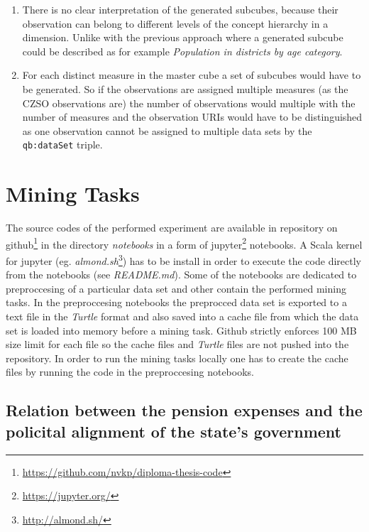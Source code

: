 \begin{enumerate}
    \item There is no clear interpretation of the generated subcubes, because their observation can belong to different levels of the concept hierarchy in a dimension. Unlike with the previous approach where a generated subcube could be described as for example \textit{Population in districts by age category}.
    \item For each distinct measure in the master cube a set of subcubes would have to be generated. So if the observations are assigned multiple measures (as the CZSO observations are) the number of observations would multiple with the number of measures and the observation URIs would have to be distinguished as one observation cannot be assigned to multiple data sets by the \verb|qb:dataSet| triple.
\end{enumerate}

\section{Mining Tasks}

The source codes of the performed experiment are available in repository on github\footnote{\href{https://github.com/nvkp/diploma-thesis-code}{https://github.com/nvkp/diploma-thesis-code}} in the directory \textit{notebooks} in a form of jupyter\footnote{\href{https://jupyter.org/}{https://jupyter.org/}} notebooks. A Scala kernel for jupyter (eg. \textit{almond.sh}\footnote{\href{http://almond.sh/}{http://almond.sh/}}) has to be install in order to execute the code directly from the notebooks (see \textit{README.md}). Some of the notebooks are dedicated to preproccesing of a particular data set and other contain the performed mining tasks. In the preproccesing notebooks the preprocced data set is exported to a text file in the \textit{Turtle} format and also saved into a cache file from which the data set is loaded into memory before a mining task.  Github strictly enforces 100 MB size limit for each file so the cache files and \textit{Turtle} files are not pushed into the repository. In order to run the mining tasks locally one has to create the cache files by running the code in the preproccesing notebooks.

\subsection{Relation between the pension expenses and the policital alignment of the state's government\label{expenses-wikidata}}

